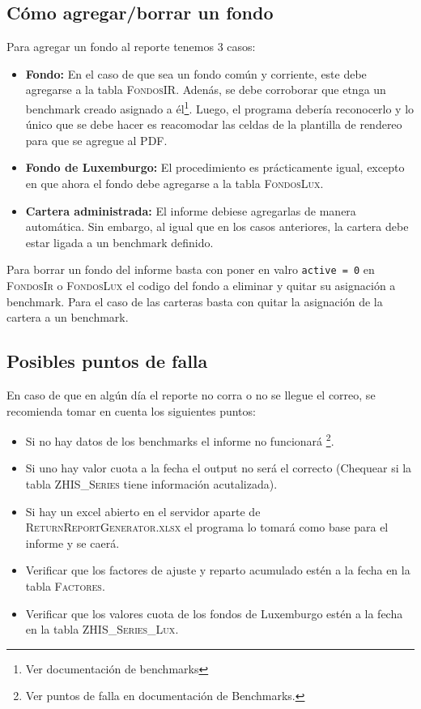 \documentclass{article}
\begin{document}


\subsection{Cómo agregar/borrar un fondo}
Para agregar un fondo al reporte tenemos 3 casos:
\begin{itemize}
\item \textbf{Fondo:} En el caso de que sea un fondo común y corriente, este debe agregarse a la tabla \textsc{FondosIR}. Adenás, se debe corroborar que etnga un benchmark creado asignado a él\footnote{Ver documentación de benchmarks}. Luego, el programa debería reconocerlo y lo único que se debe hacer es reacomodar las celdas de la plantilla de rendereo para que se agregue al PDF.
\item \textbf{Fondo de Luxemburgo:} El procedimiento es prácticamente igual, excepto en que ahora el fondo debe agregarse a la tabla \textsc{FondosLux}.
\item \textbf{Cartera administrada:} El informe debiese agregarlas de manera automática. Sin embargo, al igual que en los casos anteriores, la cartera debe estar ligada a un benchmark definido.
\end{itemize}


Para borrar un fondo del informe basta con poner en valro \texttt{active = 0} en \textsc{FondosIr} o \textsc{FondosLux} el codigo del fondo a eliminar y quitar su asignación a benchmark. Para el caso de las carteras basta con quitar la asignación de la cartera a un benchmark.


\subsection{Posibles puntos de falla}

En caso de que en algún día el reporte no corra o no se llegue el correo, se recomienda tomar en cuenta los siguientes puntos:
\begin{itemize}
\item Si no hay datos de los benchmarks el informe no funcionará \footnote{Ver puntos de falla en documentación de Benchmarks.}.
\item Si uno hay valor cuota a la fecha el output no será el correcto (Chequear si la tabla \textsc{ZHIS\_Series} tiene información acutalizada).
\item Si hay un excel abierto en el servidor aparte de \textsc{ReturnReportGenerator.xlsx} el programa lo tomará como base para el informe y se caerá.
\item Verificar que los factores de ajuste y reparto acumulado estén a la fecha en la tabla \textsc{Factores}.
\item Verificar que los valores cuota de los fondos de Luxemburgo estén a la fecha en la tabla \textsc{ZHIS\_Series\_Lux}.
\end{itemize}
\end{document}
